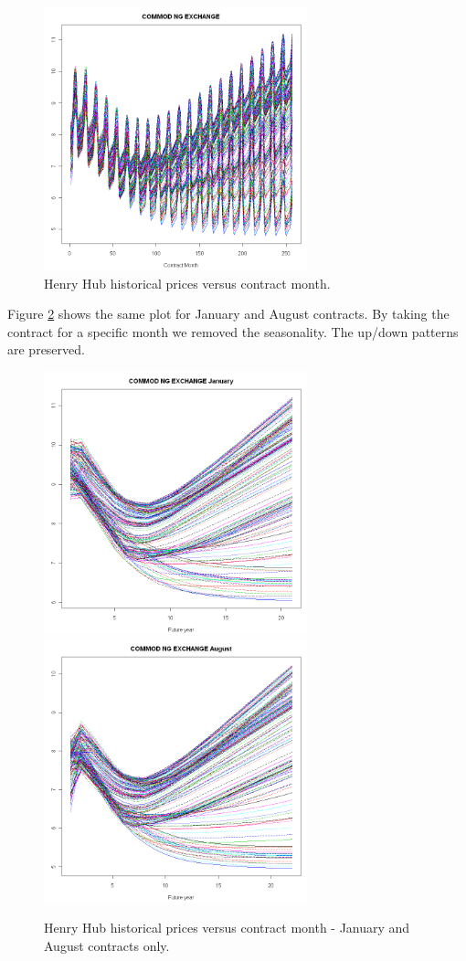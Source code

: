 \begin{figure}[htbp]
\centering
\includegraphics[width=3in, height=3in]{figures/henry04.png}
\caption{Henry Hub historical prices versus contract month.}
\label{henry-contract}
\end{figure}

Figure \ref{henry-contract-mon} shows the same plot
for January and August contracts. By taking the contract for a 
specific month we removed the seasonality. The up/down patterns
are preserved. 
\begin{figure}[htbp]
\centering
\includegraphics[width=3in, height=3in]{figures/henry06.png}
\includegraphics[width=3in, height=3in]{figures/henry05.png}
\caption{Henry Hub historical prices versus contract month -
January and August contracts only.}
\label{henry-contract-mon}
\end{figure}


